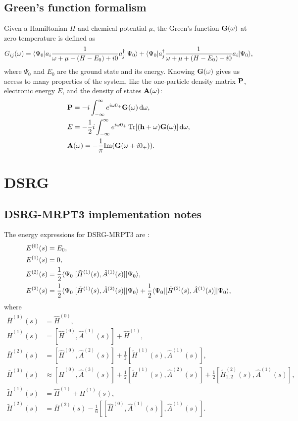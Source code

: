 \documentclass{article}
\begin{document}
\subsection{Green's function formalism}
Given a Hamiltonian $H$ and chemical potential $\mu$, the Green's function $\bm{\mathrm{G}}(\omega)$ at zero temperature is defined as
\begin{equation}
    G_{ij}(\omega)=\langle\Psi_0|a_i\frac{1}{\omega+\mu-(H-E_0)+i0}a_j^{\dagger}|\Psi_0\rangle+\langle\Psi_0|a_j^{\dagger}\frac{1}{\omega+\mu+(H-E_0)-i0}a_i|\Psi_0\rangle,
\end{equation}
where $\Psi_0$ and $E_0$ are the ground state and its energy. Knowing $\bm{\mathrm{G}}(\omega)$ gives us access to many properties of the system, like the one-particle density matrix $\bm{\mathrm{P}}$, electronic energy $E$, and the density of states $\bm{\mathrm{A}}(\omega)$:
\begin{align}
    &\bvec{P}=-i\int^{\infty}_{-\infty}e^{i\omega 0_+}\bvec{G}(\omega)\dl\omega,\\
    &E=-\frac{1}{2}i\int^{\infty}_{-\infty}e^{i\omega 0_+}\Tr[(\bvec{h}+\omega)\bvec{G}(\omega)]\dl\omega,\\
    &\bvec{A}(\omega)=-\frac{1}{\pi}\mathrm{Im}(\bvec{G}(\omega+i0_+)).
\end{align}

\section{DSRG}
\subsection{DSRG-MRPT3 implementation notes}
The energy expressions for DSRG-MRPT3 are \cite{liDrivenSimilarityRenormalization2017}:
\begin{align}
    &E^{(0)}(s)=E_0,\\
    &E^{(1)}(s)=0,\\
    &E^{(2)}(s)=\frac{1}{2}\langle\Psi_0|[\tilde{H}^{(1)}(s),\hat{A}^{(1)}(s)]|\Psi_0\rangle ,\\
    &E^{(3)}(s)=\frac{1}{2}\langle\Psi_0|[\tilde{H}^{(1)}(s),\hat{A}^{(2)}(s)]|\Psi_0\rangle +\frac{1}{2}\langle\Psi_0|[\tilde{H}^{(2)}(s),\hat{A}^{(1)}(s)]|\Psi_0\rangle,
\end{align}
where 
\begin{align}
    \bar{H}^{(0)}(s)&=\hat{H}^{(0)},\\
    \bar{H}^{(1)}(s)&=[\hat{H}^{(0)},\hat{A}^{(1)}(s)]+\hat{H}^{(1)},\\
    \bar{H}^{(2)}(s)&=[\hat{H}^{(0)},\hat{A}^{(2)}(s)]+\frac{1}{2}[\tilde{H}^{(1)}(s),\hat{A}^{(1)}(s)],\\
    \bar{H}^{(3)}(s)&\approx [\hat{H}^{(0)},\hat{A}^{(3)}(s)]+\frac{1}{2}[\tilde{H}^{(1)}(s),\hat{A}^{(2)}(s)]+\frac{1}{2}[\tilde{H}^{(2)}_{1,2}(s),\hat{A}^{(1)}(s)],\\
    \tilde{H}^{(1)}(s)&=\hat{H}^{(1)}+\bar{H}^{(1)}(s),\\
    \tilde{H}^{(2)}(s)&=\bar{H}^{(2)}(s)-\frac{1}{6}[[\hat{H}^{(0)},\hat{A}^{(1)}(s) ], \hat{A}^{(1)}(s) ].
\end{align}
\end{document}
